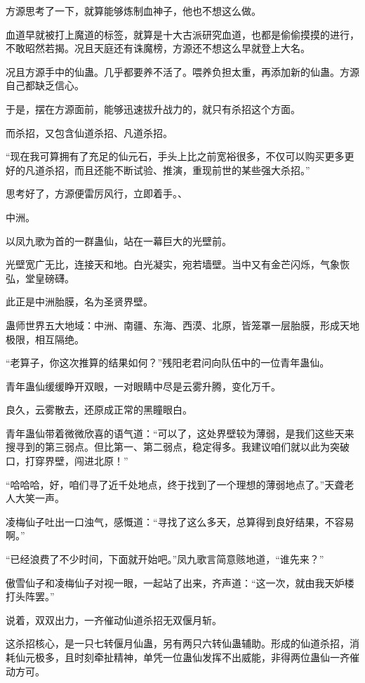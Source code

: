 \begin{this_body}
方源思考了一下，就算能够炼制血神子，他也不想这么做。

血道早就被打上魔道的标签，就算是十大古派研究血道，也都是偷偷摸摸的进行，不敢昭然若揭。况且天庭还有诛魔榜，方源还不想这么早就登上大名。

况且方源手中的仙蛊。几乎都要养不活了。喂养负担太重，再添加新的仙蛊。方源自己都缺乏信心。

于是，摆在方源面前，能够迅速拔升战力的，就只有杀招这个方面。

而杀招，又包含仙道杀招、凡道杀招。

“现在我可算拥有了充足的仙元石，手头上比之前宽裕很多，不仅可以购买更多更好的凡道杀招，而且还能不断试验、推演，重现前世的某些强大杀招。”

思考好了，方源便雷厉风行，立即着手。、

中洲。

以凤九歌为首的一群蛊仙，站在一幕巨大的光壁前。

光壁宽广无比，连接天和地。白光凝实，宛若墙壁。当中又有金芒闪烁，气象恢弘，堂皇磅礴。

此正是中洲胎膜，名为圣贤界壁。

蛊师世界五大地域：中洲、南疆、东海、西漠、北原，皆笼罩一层胎膜，形成天地极限，相互隔绝。

“老算子，你这次推算的结果如何？”残阳老君问向队伍中的一位青年蛊仙。

青年蛊仙缓缓睁开双眼，一对眼睛中尽是云雾升腾，变化万千。

良久，云雾散去，还原成正常的黑瞳眼白。

青年蛊仙带着微微欣喜的语气道：“可以了，这处界壁较为薄弱，是我们这些天来搜寻到的第三弱点。但比第一、第二弱点，稳定得多。我建议咱们就以此为突破口，打穿界壁，闯进北原！”

“哈哈哈，好，咱们寻了近千处地点，终于找到了一个理想的薄弱地点了。”天聋老人大笑一声。

凌梅仙子吐出一口浊气，感慨道：“寻找了这么多天，总算得到良好结果，不容易啊。”

“已经浪费了不少时间，下面就开始吧。”凤九歌言简意赅地道，“谁先来？”

傲雪仙子和凌梅仙子对视一眼，一起站了出来，齐声道：“这一次，就由我天妒楼打头阵罢。”

说着，双双出力，一齐催动仙道杀招无双偃月斩。

这杀招核心，是一只七转偃月仙蛊，另有两只六转仙蛊辅助。形成的仙道杀招，消耗仙元极多，且时刻牵扯精神，单凭一位蛊仙发挥不出威能，非得两位蛊仙一齐催动方可。


\end{this_body}
